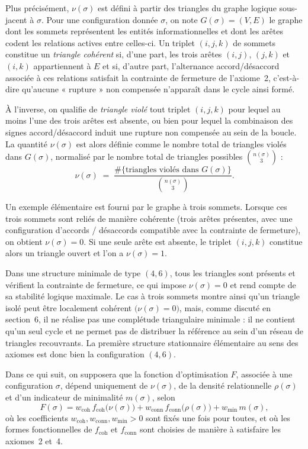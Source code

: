 \documentclass[11pt,a4paper]{article}
\begin{document}
Plus précisément, \(\nu\left(\sigma\right)\) est défini à partir des triangles du graphe logique sous-jacent à \(\sigma\). Pour une configuration donnée \(\sigma\), on note \(G(\sigma) = (V,E)\) le graphe dont les sommets représentent les entités informationnelles et dont les arêtes codent les relations actives entre celles-ci. Un triplet \((i,j,k)\) de sommets constitue un \emph{triangle cohérent} si, d’une part, les trois arêtes \((i,j)\), \((j,k)\) et \((i,k)\) appartiennent à \(E\) et si, d’autre part, l’alternance accord/désaccord associée à ces relations satisfait la contrainte de fermeture de l’axiome~2, c’est-à-dire qu’aucune « rupture » non compensée n’apparaît dans le cycle ainsi formé.

À l’inverse, on qualifie de \emph{triangle violé} tout triplet \((i,j,k)\) pour lequel au moins l’une des trois arêtes est absente, ou bien pour lequel la combinaison des signes accord/désaccord induit une rupture non compensée au sein de la boucle. La quantité \(\nu(\sigma)\) est alors définie comme le nombre total de triangles violés dans \(G(\sigma)\), normalisé par le nombre total de triangles possibles \(\binom{n(\sigma)}{3}\) :
\[
\nu(\sigma)
 \;=\;
 \frac{\#\{\text{triangles violés dans } G(\sigma)\}}{\binom{n(\sigma)}{3}}.
\]

Un exemple élémentaire est fourni par le graphe à trois sommets. Lorsque ces trois sommets sont reliés de manière cohérente (trois arêtes présentes, avec une configuration d’accords / désaccords compatible avec la contrainte de fermeture), on obtient \(\nu(\sigma)=0\). Si une seule arête est absente, le triplet \((i,j,k)\) constitue alors un triangle ouvert et l’on a \(\nu(\sigma)=1\). 

Dans une structure minimale de type \((4,6)\), tous les triangles sont présents et vérifient la contrainte de fermeture, ce qui impose \(\nu(\sigma)=0\) et rend compte de sa stabilité logique maximale. Le cas à trois sommets montre ainsi qu’un triangle isolé peut être localement cohérent \(\bigl(\nu(\sigma)=0\bigr)\), mais, comme discuté en section~6, il ne réalise pas une complétude triangulaire minimale : il ne contient qu’un seul cycle et ne permet pas de distribuer la référence au sein d’un réseau de triangles recouvrants. La première structure stationnaire élémentaire au sens des axiomes est donc bien la configuration \((4,6)\).

Dans ce qui suit, on supposera que la fonction d’optimisation \(F\), associée à une configuration \(\sigma\), dépend uniquement de \(\nu(\sigma)\), de la densité relationnelle \(\rho(\sigma)\) et d’un indicateur de minimalité \(m(\sigma)\), selon
\[
F(\sigma)
= w_{\mathrm{coh}}\, f_{\mathrm{coh}}\bigl(\nu(\sigma)\bigr)
+ w_{\mathrm{conn}}\, f_{\mathrm{conn}}\bigl(\rho(\sigma)\bigr)
+ w_{\mathrm{min}}\, m(\sigma),
\]
où les coefficients \(w_{\mathrm{coh}}, w_{\mathrm{conn}}, w_{\mathrm{min}} > 0\) sont fixés une fois pour toutes, et où les formes fonctionnelles de \(f_{\mathrm{coh}}\) et \(f_{\mathrm{conn}}\) sont choisies de manière à satisfaire les axiomes~2 et~4.
\end{document}
